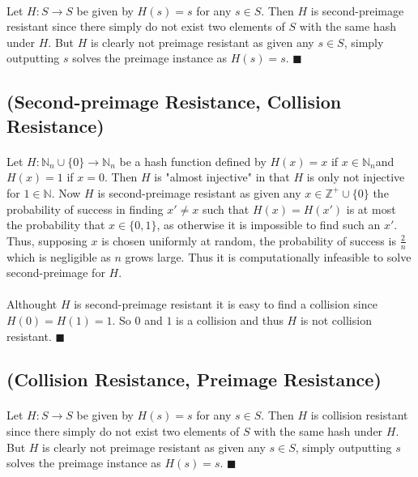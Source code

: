\documentclass[letterpaper,12pt,oneside,onecolumn]{report}
\begin{document}
\paragraph{}
Let $H: S \rightarrow S$ be given by $H(s) = s$ for any $s \in S$. Then $H$ is second-preimage resistant since there simply do not exist two elements of $S$ with the same hash under $H$. But $H$ is clearly not preimage resistant as given any $s \in S$, simply outputting $s$ solves the preimage instance as $H(s) = s$. $\blacksquare$
\subsection*{(Second-preimage Resistance, Collision Resistance)}
\paragraph{}
Let $H: \mathbb{N}_n \cup \{0\} \rightarrow \mathbb{N}_n$ be a hash function defined by $H(x) = x$ if $x \in \mathbb{N}_n$and $H(x) = 1$ if $x = 0$. Then $H$ is "almost injective" in that $H$ is only not injective for $1 \in \mathbb{N}$. Now $H$ is second-preimage resistant as given any $x \in \mathbb{Z}^+ \cup \{0\}$ the probability of success in finding $x' \neq x$ such that $H(x) = H(x')$ is at most the probability that $x\in \{0,1\}$, as otherwise it is impossible to find such an $x'$. Thus, supposing $x$ is chosen uniformly at random, the probability of success is $\frac{2}{n}$ which is negligible as $n$ grows large. Thus it is computationally infeasible to solve second-preimage for $H$.
\paragraph{}
Althought $H$ is second-preimage resistant it is easy to find a collision since $H(0) = H(1) = 1$. So $0$ and $1$ is a collision and thus $H$ is not collision resistant. $\blacksquare$
\subsection*{(Collision Resistance, Preimage Resistance)}
\paragraph{}
Let $H: S \rightarrow S$ be given by $H(s) = s$ for any $s \in S$. Then $H$ is collision resistant since there simply do not exist two elements of $S$ with the same hash under $H$. But $H$ is clearly not preimage resistant as given any $s \in S$, simply outputting $s$ solves the preimage instance as $H(s) = s$. $\blacksquare$
\end{document}
